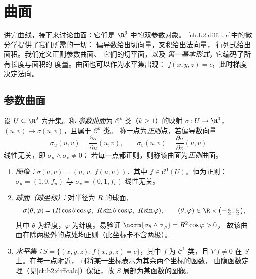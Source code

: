 \chapter{曲面}\label{ch:b2:surfaces}

讲完曲线，接下来讨论曲面：它们是 $\R^3$ 中的双参数对象。
\cref{ch:b2:diffcalc}中的微分学提供了我们所需的一切：
偏导数给出切向量，叉积给出法向量，
行列式给出面积。我们定义正则参数曲面、
它们的切平面，以及
\emph{第一基本形式}，它编码了所有长度与面积的
度量。曲面也可以作为水平集出现：
$f(x, y, z) = c$，此时梯度决定法向。

\section{参数曲面}

\begin{definition}[正则参数曲面]\label{def:b2:surfaces:param}
设 $U \subseteq \R^2$ 为开集。称
\emph{参数曲面}为 $\mathcal{C}^k$ 类（$k \geq 1$）的映射
$\sigma \colon U \to
\R^3$，$(u, v) \mapsto \sigma(u, v)$，且属于 $\mathcal{C}^k$ 类。
称一点为\emph{正则}点，若偏导数向量
\[
\sigma_u(u, v) = \frac{\partial\sigma}{\partial u}(u,v),
\qquad
\sigma_v(u, v) = \frac{\partial\sigma}{\partial v}(u,v)
\]
线性无关，即 $\sigma_u \wedge \sigma_v \neq 0$；
若每一点都正则，则称该曲面为\emph{正则}曲面。
\end{definition}

\begin{example}[三种标准描述]\label{ex:b2:surfaces:standard}
\leavevmode
\begin{enumerate}
\item \emph{图像：}$\sigma(u, v) = (u,\ v,\ f(u, v))$，其中 $f \in
\mathcal{C}^1(U)$。恒为正则：$\sigma_u = (1, 0, f_u)$ 与
$\sigma_v = (0, 1, f_v)$ 线性无关。
\item \emph{球面（球坐标）：}对半径为
$R$ 的球面，
\[
\sigma(\theta, \varphi)
= (R\cos\theta\cos\varphi,\ R\sin\theta\cos\varphi,\
R\sin\varphi),
\qquad
(\theta, \varphi) \in \R \times
\bigl(-\tfrac\pi2, \tfrac\pi2\bigr),
\]
其中 $\theta$ 为经度，$\varphi$ 为纬度。易验证
$\norm{\sigma_\theta \wedge \sigma_\varphi} = R^2\cos\varphi > 0$，
故该曲面在除两极外的点处均正则（此坐标卡不含两极）。
\item \emph{水平集：}$S = \{(x,y,z) : f(x, y, z) = c\}$，其中
$f$ 为 $\mathcal{C}^1$ 类，且 $\nabla f \neq 0$ 在 $S$ 上。在每一点附近，
可将某一坐标表示为其余两个坐标的函数，
由隐函数定理（见\cref{ch:b2:diffcalc}）保证，故
$S$ 局部为某函数的图像。
\end{enumerate}
\end{example}

